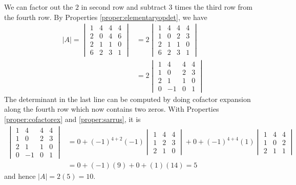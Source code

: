 \begin{solution}
We can factor out the $2$ in second row and subtract $3$ times the third row from the fourth row. By Properties \ref{proper:elementaryopdet}, we have
\begin{align*}
|A| = 
\begin{vmatrix}
1 & 4 & 4 & 4 \\
2 & 0 & 4 & 6 \\
2 & 1 & 1 & 0 \\
6 & 2 & 3 & 1
\end{vmatrix}
&=
2
\begin{vmatrix}
1 & 4 & 4 & 4 \\
1 & 0 & 2 & 3 \\
2 & 1 & 1 & 0 \\
6 & 2 & 3 & 1
\end{vmatrix} \\
&= 
2
\begin{vmatrix}
1 & 4 & 4 & 4 \\
1 & 0 & 2 & 3 \\
2 & 1 & 1 & 0 \\
0 & -1 & 0 & 1
\end{vmatrix} 
\end{align*}
The determinant in the last line can be computed by doing cofactor expansion along the fourth row which now contains two zeros. With Properties \ref{proper:cofactorex} and \ref{proper:sarrus}, it is
\begin{align*}
\begin{vmatrix}
1 & 4 & 4 & 4 \\
1 & 0 & 2 & 3 \\
2 & 1 & 1 & 0 \\
0 & -1 & 0 & 1
\end{vmatrix}
&= 0 + (-1)^{4+2}(-1)
\begin{vmatrix}
1 & 4 & 4 \\
1 & 2 & 3 \\
2 & 1 & 0 
\end{vmatrix} 
+ 0 + (-1)^{4+4}(1)
\begin{vmatrix}
1 & 4 & 4 \\
1 & 0 & 2 \\
2 & 1 & 1 
\end{vmatrix} \\
&= 0 + (-1)(9) + 0 + (1)(14) = 5
\end{align*}
and hence $|A| = 2(5) = 10$.
\end{solution}

